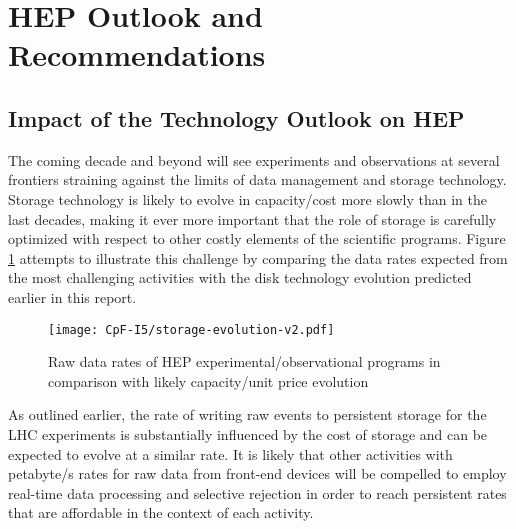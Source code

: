 \section{HEP Outlook and Recommendations}
\label{sec:cpfi5-hep-outlook}
\subsection{Impact of the Technology Outlook on HEP}
The coming decade and beyond will see experiments and observations at several 
frontiers straining against the limits of data management and storage technology.  
Storage technology is likely to evolve in capacity/cost more slowly than in the 
last decades, making it ever more important that the role of storage is carefully 
optimized with respect to other costly elements of the scientific programs.  
Figure \ref{fig:storage-evolution} attempts to illustrate this challenge by comparing the data rates 
expected from the most challenging activities with the disk technology evolution 
predicted earlier in this report.  

\begin{figure}[h]
\centering
\texttt{[image: CpF-I5/storage-evolution-v2.pdf]}
\caption{Raw data rates of HEP experimental/observational programs in comparison with likely capacity/unit price evolution}
\label{fig:storage-evolution}
\end{figure}

As outlined earlier, the rate of writing raw events to persistent storage for the 
LHC experiments is substantially influenced by the cost of storage and can be 
expected to evolve at a similar rate.
It is likely that other activities with petabyte/s rates for raw data from 
front-end devices will be compelled to employ real-time data processing and 
selective rejection in order to reach persistent rates that are affordable 
in the context of each activity.


